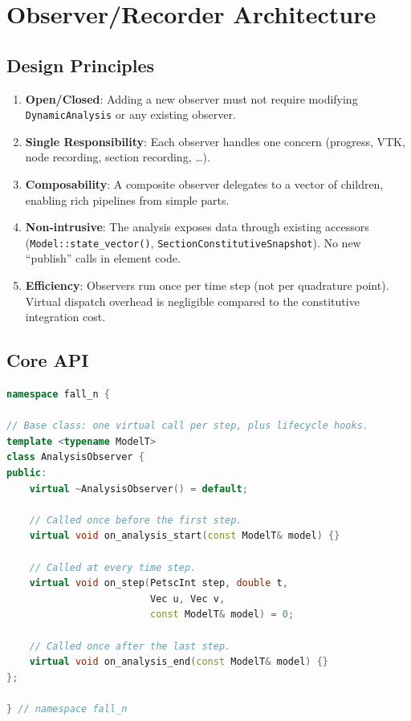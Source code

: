 \section{Observer/Recorder Architecture}
\label{sec:obs-architecture}

\subsection{Design Principles}

\begin{enumerate}
  \item \textbf{Open/Closed}: Adding a new observer must not require
        modifying \texttt{DynamicAnalysis} or any existing observer.
  \item \textbf{Single Responsibility}: Each observer handles one
        concern (progress, VTK, node recording, section recording,
        \ldots).
  \item \textbf{Composability}: A composite observer delegates to a
        vector of children, enabling rich pipelines from simple parts.
  \item \textbf{Non-intrusive}: The analysis exposes data through
        existing accessors (\texttt{Model::state\_vector()},
        \texttt{SectionConstitutiveSnapshot}).  No new ``publish'' calls
        in element code.
  \item \textbf{Efficiency}: Observers run once per time step (not per
        quadrature point).  Virtual dispatch overhead is negligible
        compared to the constitutive integration cost.
\end{enumerate}

\subsection{Core API}

\begin{lstlisting}[language=C++,basicstyle=\ttfamily\small]
namespace fall_n {

// Base class: one virtual call per step, plus lifecycle hooks.
template <typename ModelT>
class AnalysisObserver {
public:
    virtual ~AnalysisObserver() = default;

    // Called once before the first step.
    virtual void on_analysis_start(const ModelT& model) {}

    // Called at every time step.
    virtual void on_step(PetscInt step, double t,
                         Vec u, Vec v,
                         const ModelT& model) = 0;

    // Called once after the last step.
    virtual void on_analysis_end(const ModelT& model) {}
};

} // namespace fall_n
\end{lstlisting}

